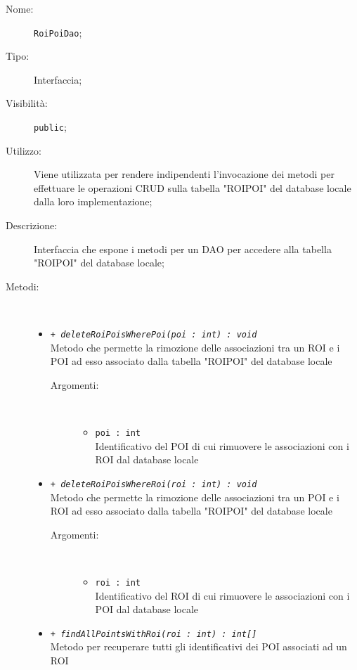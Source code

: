 \documentclass[../DefinizioneDiProdotto.tex]{subfiles}
\begin{document}
\begin{description}
	\item[Nome:] \texttt{RoiPoiDao};
	\item[Tipo:] Interfaccia;
	\item[Visibilità:] \texttt{public};
	\item[Utilizzo:] Viene utilizzata per rendere indipendenti l'invocazione dei metodi per effettuare le operazioni CRUD sulla tabella "ROIPOI" del database locale dalla loro implementazione;
	\item[Descrizione:] Interfaccia che espone i metodi per un DAO per accedere alla tabella "ROIPOI" del database locale;
	\item[Metodi:] \
	\begin{itemize}
		\item \texttt{+ \textit{deleteRoiPoisWherePoi(poi : int) : void}}\\
		Metodo che permette la rimozione delle associazioni tra un ROI e i POI ad esso associato dalla tabella "ROIPOI" del database locale 
		\begin{description}
			\item[Argomenti:] \
			\begin{itemize}
				\item \texttt{poi : int}\\
				Identificativo del POI di cui rimuovere le associazioni con i ROI dal database locale\end{itemize}
		\end{description}
		\item \texttt{+ \textit{deleteRoiPoisWhereRoi(roi : int) : void}}\\
		Metodo che permette la rimozione delle associazioni tra un POI e i ROI ad esso associato dalla tabella "ROIPOI" del database locale 
		\begin{description}
			\item[Argomenti:] \
			\begin{itemize}
				\item \texttt{roi : int}\\
				Identificativo del ROI di cui rimuovere le associazioni con i POI dal database locale\end{itemize}
		\end{description}
		\item \texttt{+ \textit{findAllPointsWithRoi(roi : int) : int[]}}\\
		Metodo per recuperare tutti gli identificativi dei POI associati ad un ROI 
		\begin{description}

\end{description}
\end{itemize}
\end{description}
\end{document}
